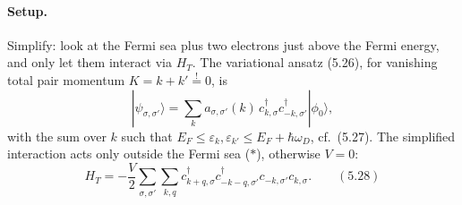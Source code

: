 \documentclass[../../main.tex]{subfiles}
\begin{document}
\paragraph{Setup.}
Simplify: look at the Fermi sea plus two electrons just above the Fermi energy, and only
let them interact via $H_T$. The variational ansatz (5.26), for vanishing total pair
momentum $K=k+k'\overset{!}{=}0$, is
\begin{equation}
|\psi_{\sigma,\sigma'}\rangle=\sum_k a_{\sigma,\sigma'}(k)\,
c^\dagger_{k,\sigma}c^\dagger_{-k,\sigma'}|\phi_0\rangle ,
\end{equation}
with the sum over $k$ such that $E_F\le\varepsilon_k,\varepsilon_{k'}\le
E_F+\hbar\omega_D$, cf.\ (5.27). The simplified interaction acts only outside the Fermi
sea ($\ast$), otherwise $V=0$:
\begin{equation}
H_T=-\frac{V}{2}\sum_{\sigma,\sigma'}\sum_{k,q}
c^\dagger_{k+q,\sigma}c^\dagger_{-k-q,\sigma'}c_{-k,\sigma'}c_{k,\sigma}.
\qquad (5.28)
\end{equation}
\end{document}
